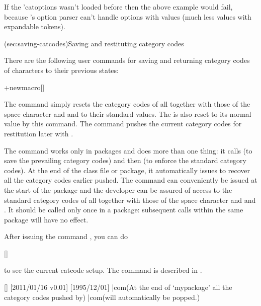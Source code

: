 \documentclass[
  use-a4-paper,
  use-10pt-font,
  final-version,
  use-UK-English,
  fancy-section-headings,
  frame-section-numbers,
  para-abstract-style,
  input-config-file,
  no-hyperref-messages
]{amltxdoc}
\begin{document}
If the \pkg'{catoptions} wasn't loaded before \hx{\documentclass} then the above example would fail, because \latex's option parser can't handle options with values (much less values with expandable tokens).


\docsection(sec:saving-catcodes){Saving and restituting category codes}

There are the following user commands for saving and returning category codes of  characters to their previous states:

\start+{newmacro}[]
\cptnormalcatcodes
\cptpushcatcodes
\cptpopcatcodes
\UseNormalCatcodes
\GetCurrentCatcodeSubset
\cptfutureletsetup
{}
\fxim*{\UseNormalCatcodes,\cptpushcatcodes,\cptpopcatcodes,
\cptnormalcatcodes,\cptfutureletsetup,\GetCurrentCatcodeSubset}

The command \fx{\cptnormalcatcodes} simply resets the category codes of all \otherchars together with those of the space character and  and  to their standard values. The \hx{\endlinechar} is also reset to its normal value by this command. The command \fx{\cptpushcatcodes} pushes the current category codes for restitution later with \fx{\cptpopcatcodes}.

The command \fx{\UseNormalCatcodes} works only in packages and does more than one thing: it calls \fx{\cptpushcatcodes} (to save the prevailing category codes) and then \fx{\cptnormalcatcodes} (to enforce the standard category codes). At the end of the class file or package, it automatically issues \fx{\cptpopcatcodes} to recover all the category codes earlier pushed. The command \fx{\UseNormalCatcodes} can conveniently be issued at the start of the package and the developer can be assured of access to the standard category codes of all \otherchars together with those of the space character and  and . It should be called only once in a package: subsequent calls within the same package will have no effect.

After issuing the command \fx{\GetCurrentCatcodeSubset}, you can do

[\currentcatcodesubset]
\show\currentcatcodesubset
{}
\fxim*{\currentcatcodesubset}

to see the current catcode setup. The command \fx{\cptfutureletsetup} is described in .

[\UseNormalCatcodes]
[2011/01/16 v0.01]
[1995/12/01]
\UseNormalCatcodes
|com(At the end of `mypackage' all the category codes pushed by)
|com(\UseNormalCatcodes will automatically be popped.)
\dummyfxi*{\UseNormalCatcodes}
\end{document}
